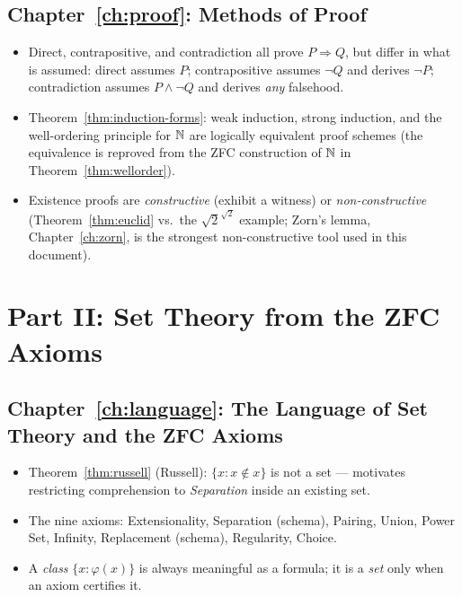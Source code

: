 \subsection*{Chapter~\ref{ch:proof}: Methods of Proof}
\begin{itemize}
	\item Direct, contrapositive, and contradiction all prove $P\Rightarrow Q$, but differ in what is assumed: direct assumes $P$; contrapositive assumes $\neg Q$ and derives $\neg P$; contradiction assumes $P\wedge\neg Q$ and derives \emph{any} falsehood.
	\item Theorem~\ref{thm:induction-forms}: weak induction, strong induction, and the well-ordering principle for $\mathbb{N}$ are logically equivalent proof schemes (the equivalence is reproved from the ZFC construction of $\mathbb{N}$ in Theorem~\ref{thm:wellorder}).
	\item Existence proofs are \emph{constructive} (exhibit a witness) or \emph{non-constructive} (Theorem~\ref{thm:euclid} vs.\ the $\sqrt2^{\sqrt2}$ example; Zorn's lemma, Chapter~\ref{ch:zorn}, is the strongest non-constructive tool used in this document).
\end{itemize}

\section*{Part II: Set Theory from the ZFC Axioms}

\subsection*{Chapter~\ref{ch:language}: The Language of Set Theory and the ZFC Axioms}
\begin{itemize}
	\item Theorem~\ref{thm:russell} (Russell): $\{x:x\notin x\}$ is not a set --- motivates restricting comprehension to \emph{Separation} inside an existing set.
	\item The nine axioms: Extensionality, Separation (schema), Pairing, Union, Power Set, Infinity, Replacement (schema), Regularity, Choice.
	\item A \emph{class} $\{x:\varphi(x)\}$ is always meaningful as a formula; it is a \emph{set} only when an axiom certifies it.
\end{itemize}

